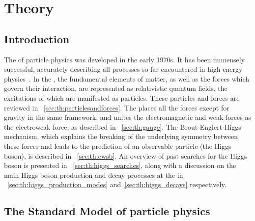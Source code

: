 \chapter{Theory}
\label{chap:theory}

\section{Introduction}

The \SM of particle physics was developed in the early 1970s. %
It has been immensely successful, accurately describing all processes so far encountered in high energy physics~\cite{PDGBooklet}. 
In the \SM, the fundamental elements of matter, as well as the forces which govern their interaction, are represented as relativistic quantum fields, the excitations of which are manifested as particles. These particles and forces are reviewed in \Sec~\ref{sec:th:particlesandforces}. The \SM places all the forces except for gravity in the same framework, and unites the electromagnetic and weak forces as the electroweak force, as described in \Sec~\ref{sec:th:gauge}. The Brout-Englert-Higgs mechanism, which explains the breaking of the underlying symmetry between these forces and leads to the prediction of an observable particle (the Higgs boson), is described in \Sec~\ref{sec:th:ewsb}. %
An overview of past searches for the Higgs boson is presented in \Sec~\ref{sec:th:higgs_searches}, along with a discussion on the main Higgs boson production and decay processes at the \LHC in \mbox{\Sec\s}~\ref{sec:th:higgs_production_modes} and~\ref{sec:th:higgs_decays} respectively.


\section{The Standard Model of particle physics}

